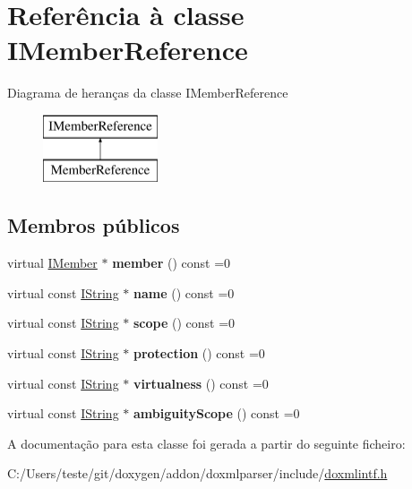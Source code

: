 \hypertarget{class_i_member_reference}{\section{Referência à classe I\-Member\-Reference}
\label{class_i_member_reference}
}
Diagrama de heranças da classe I\-Member\-Reference\begin{figure}[H]
\begin{center}
\leavevmode
\includegraphics[height=2.000000cm]{class_i_member_reference}
\end{center}
\end{figure}
\subsection*{Membros públicos}
\begin{DoxyCompactItemize}
\item 
\hypertarget{class_i_member_reference_a97592ca5d1407af95df5295ef9a1500a}{virtual \hyperlink{class_i_member}{I\-Member} $\ast$ {\bfseries member} () const =0}\label{class_i_member_reference_a97592ca5d1407af95df5295ef9a1500a}

\item 
\hypertarget{class_i_member_reference_af687440943d0a80c2b38cd5bb51b7a68}{virtual const \hyperlink{class_i_string}{I\-String} $\ast$ {\bfseries name} () const =0}\label{class_i_member_reference_af687440943d0a80c2b38cd5bb51b7a68}

\item 
\hypertarget{class_i_member_reference_af025b621d68637f1f029f4fa7e15bc39}{virtual const \hyperlink{class_i_string}{I\-String} $\ast$ {\bfseries scope} () const =0}\label{class_i_member_reference_af025b621d68637f1f029f4fa7e15bc39}

\item 
\hypertarget{class_i_member_reference_a5dc0cca2aef85806942cccf37d73c47b}{virtual const \hyperlink{class_i_string}{I\-String} $\ast$ {\bfseries protection} () const =0}\label{class_i_member_reference_a5dc0cca2aef85806942cccf37d73c47b}

\item 
\hypertarget{class_i_member_reference_a31a31d651b7fb29db639dd1da1148bae}{virtual const \hyperlink{class_i_string}{I\-String} $\ast$ {\bfseries virtualness} () const =0}\label{class_i_member_reference_a31a31d651b7fb29db639dd1da1148bae}

\item 
\hypertarget{class_i_member_reference_a2af1bf46ad15d33980b7b3e40a6efa2c}{virtual const \hyperlink{class_i_string}{I\-String} $\ast$ {\bfseries ambiguity\-Scope} () const =0}\label{class_i_member_reference_a2af1bf46ad15d33980b7b3e40a6efa2c}

\end{DoxyCompactItemize}


A documentação para esta classe foi gerada a partir do seguinte ficheiro\-:\begin{DoxyCompactItemize}
\item 
C\-:/\-Users/teste/git/doxygen/addon/doxmlparser/include/\hyperlink{include_2doxmlintf_8h}{doxmlintf.\-h}\end{DoxyCompactItemize}
